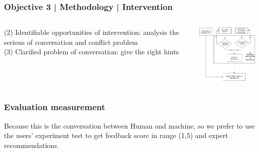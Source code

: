 \documentclass{beamer}
\begin{document}
\begin{frame}
\frametitle{Objective 3 | Methodology | Intervention}
\begin{columns}
	
	\begin{column}{.45\textwidth}
		(2) Identifiable opportunities of intervention: analysis the serious of conversation and conflict problem \\
		
		
		(3) Clarified problem of conversation: give the right hints\\
	
	\end{column}
	\begin{column}{.55\textwidth}
		\includegraphics[width=50mm]{tsv3.png}	
	\end{column}
	
\end{columns}
\end{frame}


\begin{frame}
\frametitle{Evaluation measurement}
Because this is the conversation between Human and machine, so we prefer to use the users' experiment test to get feedback score in range (1,5) and expert recommendations.


\end{frame}
\end{document}

